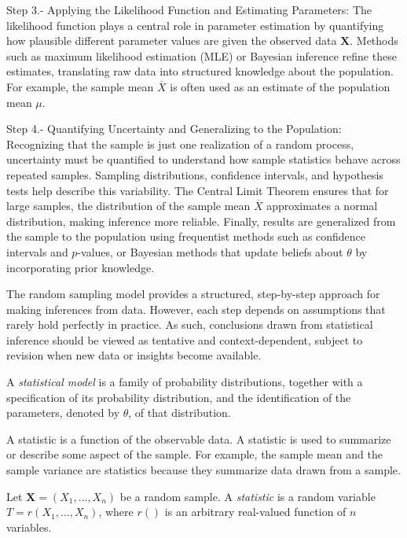 Step 3.- Applying the Likelihood Function and Estimating Parameters: The likelihood function plays a central role in parameter estimation by quantifying how plausible different parameter values are given the observed data $\mathbf{X}$. Methods such as maximum likelihood estimation (MLE) or Bayesian inference refine these estimates, translating raw data into structured knowledge about the population. For example, the sample mean $\overline{X}$ is often used as an estimate of the population mean $\mu$.

Step 4.- Quantifying Uncertainty and Generalizing to the Population: Recognizing that the sample is just one realization of a random process, uncertainty must be quantified to understand how sample statistics behave across repeated samples. Sampling distributions, confidence intervals, and hypothesis tests help describe this variability. The Central Limit Theorem ensures that for large samples, the distribution of the sample mean $\overline{X}$ approximates a normal distribution, making inference more reliable. Finally, results are generalized from the sample to the population using frequentist methods such as confidence intervals and $p$-values, or Bayesian methods that update beliefs about $\theta$ by incorporating prior knowledge.

The random sampling model provides a structured, step-by-step approach for making inferences from data. However, each step depends on assumptions that rarely hold perfectly in practice. As such, conclusions drawn from statistical inference should be viewed as tentative and context-dependent, subject to revision when new data or insights become available.

\begin{definition}
A \emph{statistical model} is a family of probability distributions, together with a specification of its probability distribution, and the identification of the parameters, denoted by $\theta$, of that distribution.
\end{definition}

A statistic is a function of the observable data. A statistic is used to summarize or describe some aspect of the sample. For example, the sample mean and the sample variance are statistics because they summarize data drawn from a sample.

\begin{definition}
Let $\mathbf{X}=\left(X_{1},\ldots,X_{n}\right)$ be a random sample. A \emph{statistic} is a random variable $T = r \left( X_1, \ldots, X_n \right)$, where $r()$ is an arbitrary real-valued function of $n$ variables.
\end{definition}

